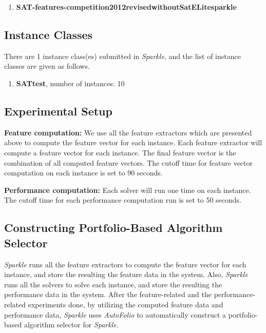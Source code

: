 \documentclass[british]{article}
\begin{document}
\begin{enumerate}
\item \textbf{SAT-features-competition2012\textunderscore revised\textunderscore without\textunderscore SatELite\textunderscore sparkle}

\end{enumerate}

\subsection{Instance Classes}
\label{sec:Instance_Classes}
There are 1 instance class(es) submitted in \emph{Sparkle}, and the list of instance classes are given as follows.

\begin{enumerate}
\item \textbf{SAT\textunderscore test}, number of instances: 10

\end{enumerate}

\subsection{Experimental Setup}
\label{sec:Experimental_Setup}

\textbf{Feature computation:} We use all the feature extractors which are presented above to compute the feature vector for each instance. Each feature extractor will compute a feature vector for each instance. The final feature vector is the combination of all computed feature vectors. The cutoff time for feature vector computation on each instance is set to 90 seconds.

\textbf{Performance computation:} Each solver will run one time on each instance. The cutoff time for each performance computation run is set to 50 seconds.

\subsection{Constructing Portfolio-Based Algorithm Selector}
\label{sec:Portfolio}

\emph{Sparkle} runs all the feature extractors to compute the feature vector for each instance, and store the resulting the feature data in the system. Also, \emph{Sparkle} runs all the solvers to solve each instance, and store the resulting the performance data in the system. After the feature-related and the performance-related experiments done, by utilizing the computed feature data and performance data, \emph{Sparkle} uses \emph{AutoFolio} \cite{LinEtAl15} to automatically construct a portfolio-based algorithm selector for \emph{Sparkle}.
\end{document}
